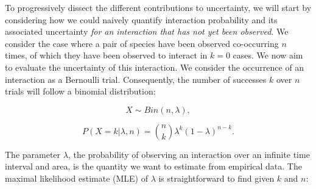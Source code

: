 \documentclass[12pt]{article}
\begin{document}
\begin{spacing}{2.0}




  To progressively dissect the different contributions to uncertainty, we will start by considering how we could naively quantify interaction probability and its associated uncertainty \emph{for an interaction that has not yet been observed}. We consider the case where a pair of species have been observed co-occurring $n$ times, of which they have been observed to interact in $k = 0$ cases. We now aim to evaluate the uncertainty of this interaction. We consider the occurrence of an interaction as a Bernoulli trial. Consequently, the number of successes $k$ over $n$ trials will follow a binomial distribution: 
      
      \begin{equation}
        X \sim Bin(n,\lambda) ,
      \end{equation}


      \begin{equation}
         P(X = k|\lambda,n) = {n \choose k}\lambda^k(1-\lambda)^{n-k} . 
         \label{likelihood}
      \end{equation}

  \noindent The parameter $\lambda$, the probability of observing an interaction over an infinite time interval and area, is the quantity we want to estimate from empirical data. 
  The maximal likelihood estimate (MLE) of $\lambda$ is straightforward to find given $k$ and $n$:


\end{spacing}
\end{document}
